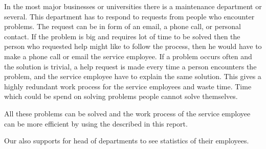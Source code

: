 In the most major businesses or universities there is a maintenance department or several. 
This department has to respond to requests from people who encounter problems. 
The request can be in form of an email, a phone call, or personal contact. 
If the problem is big and requires lot of time to be solved then the person who requested help might like to follow the process, then he would have to make a phone call or email the service employee. 
If a problem occurs often and the solution is trivial, a help request is made every time a person encounters the problem, and the service employee have to explain the same solution. 
This gives a highly redundant work process for the service employees and waste time. Time which could be spend on solving problems people cannot solve themselves. 

All these problems can be solved and the work process of the service employee can be more efficient by using the \hdesk[] described in this report. 

Our \hdesk also supports for head of departments to see statistics of their employees.